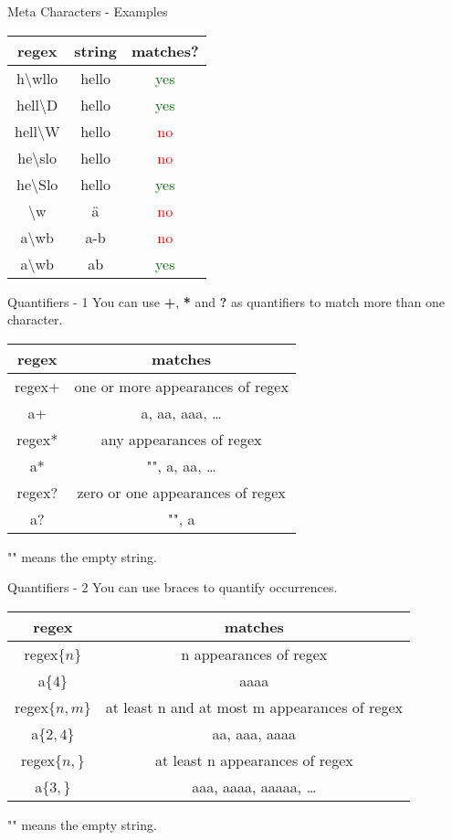 \begin{frame}{Meta Characters - Examples}
	\begin{tabular}{ c c | c }
		regex & string & matches? \\
		\hline
		h\textbackslash wllo & hello & \textcolor{darkgreen}{yes} \\
		hell\textbackslash D & hello & \textcolor{darkgreen}{yes} \\
		hell\textbackslash W & hello & \textcolor{red}{no} \\
		he\textbackslash slo & hello & \textcolor{red}{no} \\
		he\textbackslash Slo & hello & \textcolor{darkgreen}{yes} \\
		\textbackslash w & \"{a} & \textcolor{red}{no} \\
		a\textbackslash wb & a-b & \textcolor{red}{no} \\
		a\textbackslash wb & a\textunderscore{}b & \textcolor{darkgreen}{yes}
	\end{tabular}
\end{frame}

\begin{frame}{Quantifiers - 1}
	You can use \textbf{+}, \textbf{*} and \textbf{?} as quantifiers
	to match more than one character.
	\vfill
	\begin{tabular}{ c | c }
		regex & matches \\
		\hline 
		regex+ & one or more appearances of regex \\
		a+ & a, aa, aaa, \dots \\
		\hline
		regex* & any appearances of regex  \\
		a* & "", a, aa, \dots  \\
		\hline
		regex? & zero or one appearances of regex  \\
		a? & "", a 
	\end{tabular}
	\vfill
	"" means the empty string.
\end{frame}

\begin{frame}{Quantifiers - 2}
	You can use braces to quantify occurrences.
	\vfill
	\begin{tabular}{ c | c }
		regex & matches \\
		\hline 
		regex$\lbrace n\rbrace$    & n appearances of regex \\
		a$\lbrace 4\rbrace$        & aaaa \\
		\hline
		regex$\lbrace n, m\rbrace$ & at least n and at most m appearances of regex \\
		a$\lbrace 2,4\rbrace$      & aa, aaa, aaaa \\
		\hline
		regex$\lbrace n,\rbrace$   & at least n appearances of regex \\
		a$\lbrace 3,\rbrace$       & aaa, aaaa, aaaaa, \dots
	\end{tabular}
	\vfill
	"" means the empty string.
\end{frame}

